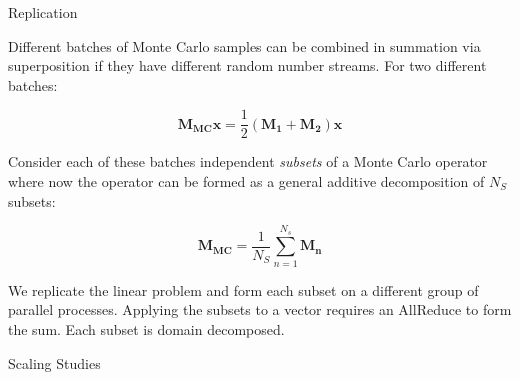 \documentclass{beamer}
\begin{document}
\begin{frame}{Replication}

  Different batches of Monte Carlo samples can be combined in summation via
  superposition if they have different random number streams. For two
  different batches:

  \[
  \mathbf{M_{MC}} \mathbf{x} =
  \frac{1}{2}(\mathbf{M_1}+\mathbf{M_2})\mathbf{x} 
  \]

  Consider each of these batches independent \textit{subsets} of a Monte Carlo
  operator where now the operator can be formed as a general additive
  decomposition of $N_S$ subsets: 

  \[
  \mathbf{M_{MC}} = \frac{1}{N_S}\sum_{n=1}^{N_s}{\mathbf{M_n}}
  \]

  We replicate the linear problem and form each subset on a different group of
  parallel processes. Applying the subsets to a vector requires an AllReduce
  to form the sum. Each subset is domain decomposed.
  
\end{frame}

\begin{frame}

  \center Scaling Studies
  
\end{frame}
\end{document}
